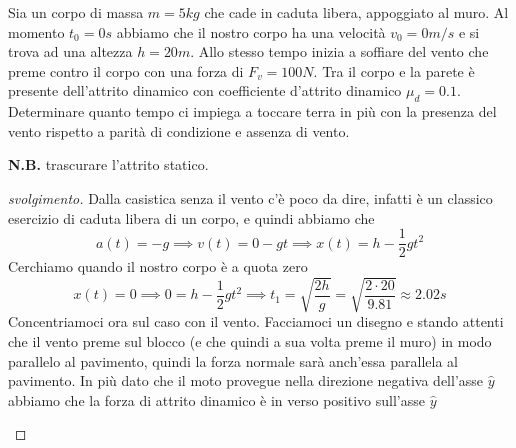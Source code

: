 \documentclass{rapport}
\begin{document}
\begin{esercizio}{}{}
  Sia un corpo di massa $m=5kg$ che cade in caduta libera, appoggiato al muro. Al momento $t_0 = 0s$ abbiamo che il nostro corpo ha una velocità $v_0 = 0m/s$ e si trova ad una altezza $h=20m$. Allo stesso tempo inizia a soffiare del vento che preme contro il corpo con una forza di $F_v = 100N$. Tra il corpo e la parete è presente dell'attrito dinamico con coefficiente d'attrito dinamico $\mu_d = 0.1$. Determinare quanto tempo ci impiega a toccare terra in più con la presenza del vento rispetto a parità di condizione e assenza di vento.    

\textbf{N.B.} trascurare l'attrito statico.
\end{esercizio}
\begin{proof}[svolgimento]
  Dalla casistica senza il vento c'è poco da dire, infatti è un classico esercizio di caduta libera di un corpo, e quindi abbiamo che 
  \[
  a(t) = -g \implies v(t) = 0 -gt \implies x(t) = h-\dfrac{1}{2}gt^2
  \]
  Cerchiamo quando il nostro corpo è a quota zero 
  \[
  x(t) = 0 \implies 0 = h-\dfrac{1}{2}gt^2 \implies t_1 = \sqrt{\dfrac{2h}{g}} =\sqrt{\dfrac{2 \cdot 20}{9.81}} \approx 2.02s
  \]
  \newpage
  Concentriamoci ora sul caso con il vento. Facciamoci un disegno e stando attenti che il vento preme sul blocco (e che quindi a sua volta preme il muro) in modo parallelo al pavimento, quindi la forza normale sarà anch'essa parallela al pavimento. In più dato che il moto provegue nella direzione negativa dell'asse $\hat{y}$ abbiamo che la forza di attrito dinamico è in verso positivo sull'asse $\hat{y}$
\begin{figure}[h]
    \centering
\end{figure}
\end{proof}
\end{document}

